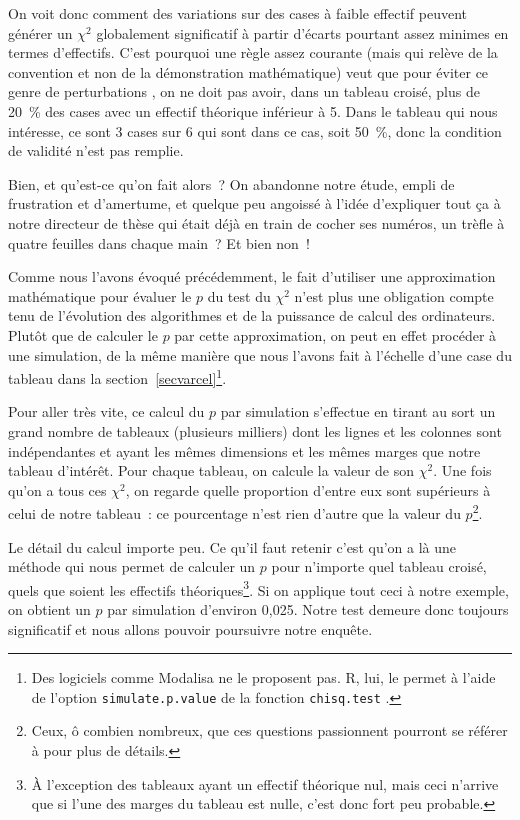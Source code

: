 \documentclass[a4paper,10pt,twoside,francais]{report}
\renewcommand{\cite}{\citep}
\newcommand{\chid}{$\chi^2$\xspace}
\begin{document}
On voit donc comment des variations sur des cases à faible effectif
peuvent générer un \chid globalement significatif à partir d'écarts
pourtant assez minimes en termes d'effectifs. C'est pourquoi une règle
assez courante (mais qui relève de la convention et non de la
démonstration mathématique) veut que pour éviter ce genre de \og
perturbations \fg{}, on ne doit pas avoir, dans un tableau croisé,
plus de 20~\% des cases avec un effectif théorique inférieur à 5. Dans
le tableau qui nous intéresse, ce sont 3 cases sur 6 qui sont dans ce
cas, soit 50~\%, donc la condition de validité n'est pas remplie.

Bien, et qu'est-ce qu'on fait alors~? On abandonne notre étude, empli
de frustration et d'amertume, et quelque peu angoissé à l'idée
d'expliquer tout ça à notre directeur de thèse qui était déjà en
train de cocher ses numéros, un trèfle à quatre feuilles dans chaque
main~? Et bien non~! 

Comme nous l'avons évoqué précédemment, le fait d'utiliser une
approximation mathématique pour évaluer le $p$ du test du \chid n'est
plus une obligation compte tenu de l'évolution des algorithmes et de
la puissance de calcul des ordinateurs. Plutôt que de calculer le $p$
par cette approximation, on peut en effet procéder à une simulation,
de la même manière que nous l'avons fait à l'échelle d'une case du
tableau dans la section~\ref{secvarcel}\footnote{Des logiciels comme
  \textsf{Modalisa} ne le proposent pas. \textsf{R}, lui, le permet à
  l'aide de l'option \texttt{simulate.p.value} de la fonction
  \texttt{chisq.test} \cite{R}.}.

Pour aller très vite, ce calcul du $p$ par simulation s'effectue en
tirant au sort un grand nombre de tableaux (plusieurs milliers) dont
les lignes et les colonnes sont indépendantes et ayant les mêmes
dimensions et les mêmes marges que notre tableau d'intérêt. Pour
chaque tableau, on calcule la valeur de son \chid. Une fois qu'on a
tous ces \chid, on regarde quelle proportion d'entre eux sont
supérieurs à celui de notre tableau~: ce pourcentage n'est rien
d'autre que la valeur du $p$\footnote{Ceux, ô combien nombreux, que
  ces questions passionnent pourront se référer à
  \cite{Chessel2005Eff} pour plus de détails.}.

Le détail du calcul importe peu. Ce qu'il faut retenir c'est qu'on a
là une méthode qui nous permet de calculer un $p$ pour n'importe quel
tableau croisé, quels que soient les effectifs théoriques\footnote{À
  l'exception des tableaux ayant un effectif théorique nul, mais ceci
  n'arrive que si l'une des marges du tableau est nulle, c'est donc
  fort peu probable.}. Si on applique tout ceci à notre exemple, on
obtient un $p$ par simulation d'environ 0,025. Notre test demeure donc
toujours significatif et nous allons pouvoir poursuivre notre enquête.
\end{document}
